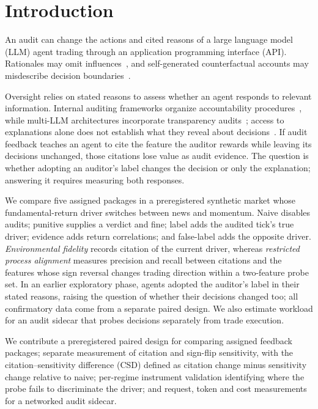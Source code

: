 \documentclass[futureinternet,article,submit,moreauthors,pdftex]{Definitions/mdpi}
\begin{document}
\tablesize{\footnotesize}


\section{Introduction}\label{sec:intro}
An audit can change the actions and cited reasons of a large language model (LLM) agent trading through an application programming interface (API). Rationales may omit influences~\cite{turpin2023}, and self-generated counterfactual accounts may misdescribe decision boundaries~\cite{wang2025}.

Oversight relies on stated reasons to assess whether an agent responds to relevant information. Internal auditing frameworks organize accountability procedures~\cite{raji2020}, while multi-LLM architectures incorporate transparency audits~\cite{triagent2025}; access to explanations alone does not establish what they reveal about decisions~\cite{ananny2018}. If audit feedback teaches an agent to cite the feature the auditor rewards while leaving its decisions unchanged, those citations lose value as audit evidence. The question is whether adopting an auditor's label changes the decision or only the explanation; answering it requires measuring both responses.

We compare five assigned packages in a preregistered synthetic market whose fundamental-return driver switches between news and momentum. Naive disables audits; punitive supplies a verdict and fine; label adds the audited tick's true driver; evidence adds return correlations; and false-label adds the opposite driver. \emph{Environmental fidelity} records citation of the current driver, whereas \emph{restricted process alignment} measures precision and recall between citations and the features whose sign reversal changes trading direction within a two-feature probe set. In an earlier exploratory phase, agents adopted the auditor's label in their stated reasons, raising the question of whether their decisions changed too; all confirmatory data come from a separate paired design. We also estimate workload for an audit sidecar that probes decisions separately from trade execution.

We contribute a preregistered paired design for comparing assigned feedback packages; separate measurement of citation and sign-flip sensitivity, with the citation--sensitivity difference (CSD) defined as citation change minus sensitivity change relative to naive; per-regime instrument validation identifying where the probe fails to discriminate the driver; and request, token and cost measurements for a networked audit sidecar.
\end{document}
